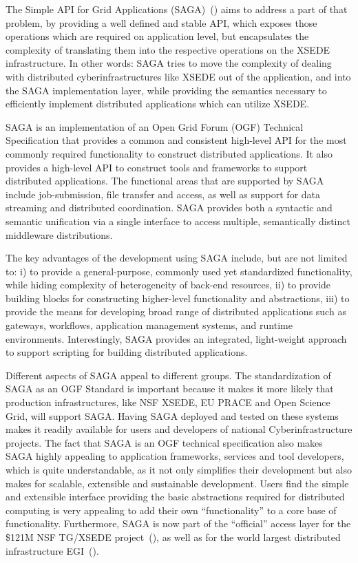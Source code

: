 \documentclass{sig-alternate}
\begin{document}
The Simple API for Grid Applications (SAGA)~(\cite{saga_url}) aims to address a
part of that problem, by providing a well defined and stable API, which
exposes those operations which are required on application level, but
encapsulates the complexity of translating them into the respective
operations on the XSEDE infrastructure.  In other words: SAGA tries
to move the complexity of dealing with distributed
cyberinfrastructures like XSEDE out of the application, and into the
SAGA implementation layer, while providing the semantics necessary to
efficiently implement distributed applications which can utilize
XSEDE.

SAGA is an implementation of an Open Grid Forum (OGF) Technical Specification
that provides a common and consistent high-level API for the most
commonly required functionality to construct distributed applications.
It also provides a high-level API to construct tools and frameworks to
support distributed applications. The functional areas that are
supported by SAGA include job-submission, file transfer and access, as
well as support for data streaming and distributed coordination. SAGA
provides both a syntactic and semantic unification via a single
interface to access multiple, semantically distinct middleware
distributions.


The key advantages of the development using SAGA include, but are not
limited to: i) to provide a general-purpose, commonly used yet
standardized functionality, while hiding complexity of heterogeneity
of back-end resources, ii) to provide building blocks for constructing
higher-level functionality and abstractions, iii) to provide the means
for developing broad range of distributed applications such as
gateways, workflows, application management systems, and runtime
environments. Interestingly, SAGA provides an integrated, light-weight
approach to support scripting for building distributed applications.

Different aspects of SAGA appeal to different groups. The
standardization of SAGA as an OGF Standard is important because it
makes it more likely that production infrastructures, like NSF XSEDE,
EU PRACE and Open Science Grid, will support SAGA. Having SAGA
deployed and tested on these systems makes it readily available for
users and developers of national Cyberinfrastructure projects. The
fact that SAGA is an OGF technical specification also makes SAGA
highly appealing to application frameworks, services and tool
developers, which is quite understandable, as it not only simplifies
their development but also makes for scalable, extensible and
sustainable development. Users find the simple and extensible
interface providing the basic abstractions required for distributed
computing is very appealing to add their own ``functionality'' to a
core base of functionality. Furthermore, SAGA is now part of the
``official'' access layer for the \$121M NSF TG/XSEDE
project~(\cite{xsede_url}), as well as for the world largest distributed
infrastructure EGI~(\cite{egi_url}).
\end{document}
